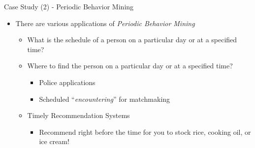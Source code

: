\documentclass[
 size=14pt,
 paper=smartboard,  %
 mode=present, 		%
 display=slides, 	%
 style=tuliplab,  	%
 pauseslide,
 fleqn,leqno]{powerdot}{}
\begin{document}
\begin{slide}[toc=,bm=]{Case Study (2) - Periodic Behavior Mining}

\begin{itemize}
\item
There are various applications of \textit{Periodic Behavior Mining}

    \begin{itemize}
    \item
    What is the schedule of a person on a particular day or at a specified time?

    \item
    Where to find the person on a particular day or at a specified time?
        \begin{itemize}
        \item
        Police applications

        \item
        Scheduled ``\textit{encountering}'' for matchmaking
        \end{itemize}
    \item
    Timely Recommendation Systems
        \begin{itemize}
        \item
        Recommend right before the time for you to stock rice, cooking oil, or ice cream!
        \end{itemize}

\end{itemize}
\end{itemize}

\end{slide}


%
%
%
%
\end{document}
